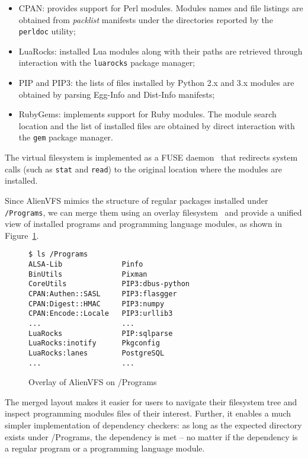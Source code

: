 \documentclass[sigplan, anonymous, 10pt]{acmart}
\begin{document}
\begin{itemize}
    \item CPAN: provides support for Perl modules. Modules names and file listings
        are obtained from \emph{packlist} manifests under the directories reported
        by the \texttt{perldoc} utility;
    \item LuaRocks: installed Lua modules along with their paths are retrieved
        through interaction with the \texttt{luarocks} package manager;
    \item PIP and PIP3: the lists of files installed by Python 2.x and 3.x modules
        are obtained by parsing Egg-Info and Dist-Info manifests;
    \item RubyGems: implements support for Ruby modules. The module search location
        and the list of installed files are obtained by direct interaction with the
        \texttt{gem} package manager.
\end{itemize}

The virtual filesystem is implemented as a FUSE daemon~\cite{miklos2001:fuse} that
redirects system calls (such as \texttt{stat} and \texttt{read}) to the original
location where the modules are installed.

Since AlienVFS mimics the structure of regular packages installed under
\texttt{/Programs}, we can merge them using an overlay filesystem~\cite{brown2018:overlayfs}
and provide a unified view of installed programs and programming language modules, as
shown in Figure~\ref{fig:alienvfs.merged}.

\begin{figure}[h]
    \begin{Verbatim}[frame=single]
$ ls /Programs
ALSA-Lib              Pinfo
BinUtils              Pixman
CoreUtils             PIP3:dbus-python
CPAN:Authen::SASL     PIP3:flasgger
CPAN:Digest::HMAC     PIP3:numpy
CPAN:Encode::Locale   PIP3:urllib3
...                   ...
LuaRocks              PIP:sqlparse
LuaRocks:inotify      Pkgconfig
LuaRocks:lanes        PostgreSQL
...                   ...
    \end{Verbatim}
    \caption{Overlay of AlienVFS on /Programs}
    \label{fig:alienvfs.merged}
\end{figure}

The merged layout makes it easier for users to navigate their filesystem tree
and inspect programming modules files of their interest. Further, it enables a
much simpler implementation of dependency checkers: as long as the expected
directory exists under /Programs, the dependency is met -- no matter if the
dependency is a regular program or a programming language module.
\end{document}
